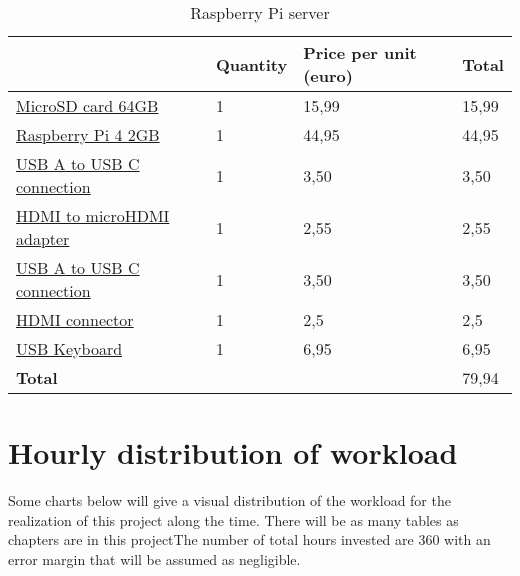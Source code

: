 \begin{table}[H]
\caption{Raspberry Pi server}
\begin{tabular}{llll}
\hline
	& \textbf{Quantity}& \textbf{Price per unit (euro)}& \textbf{Total} \\ \hline
	\rowcolor{lightgray}
\href{https://www.elcorteingles.es/electronica/A38457605-tarjeta-de-memoria-samsung-microsd-evo-plus-mb-mc64ha-64gb/#}{MicroSD card 64GB} & 1 & 15,99 & 15,99 \\
\href{https://www.tiendatec.es/raspberry-pi/gama-raspberry-pi/1099-raspberry-pi-4-modelo-b-2gb-765756931175.html?src=raspberrypi}{Raspberry Pi 4 2GB}   & 1                                        & 44,95                                              & 44,95                                 \\
\rowcolor{lightgray}
\href{https://televoz.org/conexion-usb-tipo-a-macho-a-usb-c-1-00-mts}{USB A to USB C connection} & 1 & 3,50 & 3,50 \\
\href{https://televoz.org/694_888con170n_adaptador-hdmi-hembra-a-micro-hdmi-macho-con170n}{HDMI to microHDMI adapter} & 1 & 2,55 & 2,55 \\
\rowcolor{lightgray}
\href{https://televoz.org/conexion-usb-tipo-a-macho-a-usb-c-1-00-mts}{USB A to USB C connection} & 1 & 3,50 & 3,50 \\
\href{https://televoz.org/9230_992tv4000046_conexion-hdmi-macho-macho-1-00mts-tv40-00046}{HDMI connector} & 1 & 2,5 & 2,5 \\
\rowcolor{lightgray}
\href{https://televoz.org/teclado-usb-aqprox-appkbeco}{USB Keyboard} & 1 & 6,95 & 6,95 \\
\textbf{Total} & & & 79,94 \\
\end{tabular}
\end{table}

\section{Hourly distribution of workload}
Some charts below will give a visual distribution of the workload for the realization of this project along the time. There will be as many tables as chapters are in this projectThe number of total hours invested are 360 with an error margin that will be assumed as negligible.

